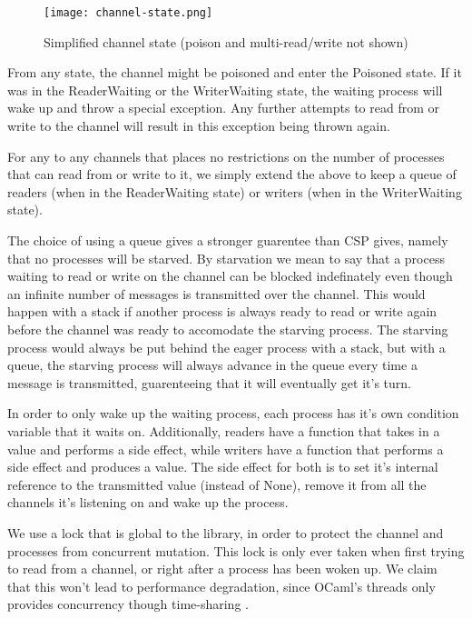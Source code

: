 \documentclass[a4paper,12pt]{article}
\begin{document}
\begin{figure}[h]
\centering
\texttt{[image: channel-state.png]}
\caption{Simplified channel state (poison and multi-read/write not shown)}
\label{channel-state}
\end{figure}

From any state, the channel might be poisoned and enter the Poisoned state. If it was in the
ReaderWaiting or the WriterWaiting state, the waiting process will wake up and throw a special
exception. Any further attempts to read from or write to the channel will result in this 
exception being thrown again.

For any to any channels that places no restrictions on the number of processes that can read
from or write to it, we simply extend the above to keep a queue of readers (when in the 
ReaderWaiting state) or writers (when in the WriterWaiting state).

The choice of using a queue gives a stronger guarentee than CSP gives, namely that no processes
will be starved. By starvation we mean to say that a process waiting to read or write on the
channel can be blocked indefinately even though an infinite number of messages is transmitted
over the channel. This would happen with a stack if another process is always ready to read or 
write again before the channel was ready to accomodate the starving process. The starving process
would always be put behind the eager process with a stack, but with a queue, the starving process
will always advance in the queue every time a message is transmitted, guarenteeing that it will
eventually get it's turn.

In order to only wake up the waiting process, each process has it's own condition variable that
it waits on. Additionally, readers have a function that takes in a value and performs a side 
effect, while writers have a function that performs a side effect and produces a value. The side
effect for both is to set it's internal reference to the transmitted value (instead of None),
remove it from all the channels it's listening on and wake up the process.

We use a lock that is global to the library, in order to protect the channel and processes from
concurrent mutation. This lock is only ever taken when first trying to read from a channel, or
right after a process has been woken up. We claim that this won't lead to performance degradation,
since OCaml's threads only provides concurrency though time-sharing \cite{ocaml-threads}.
\end{document}
